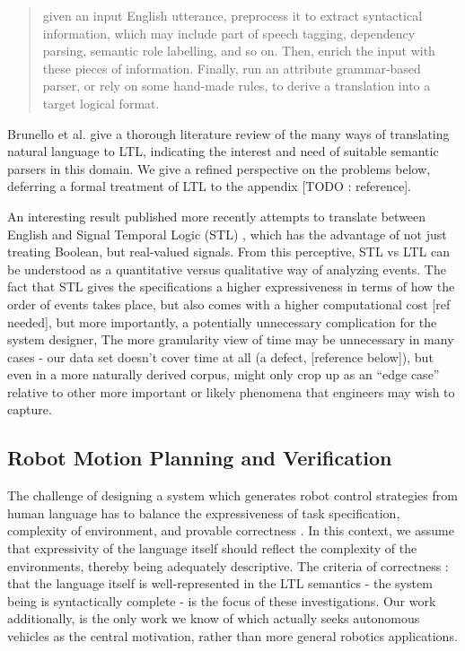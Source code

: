 \documentclass[a4paper, 11pt]{article}
\begin{document}
\begin{quote}
given an input English utterance, preprocess it to extract syntactical information, which may
include part of speech tagging, dependency parsing, semantic role labelling, and so on. Then,
enrich the input with these pieces of information. Finally, run an attribute grammar-based
parser, or rely on some hand-made rules, to derive a translation into a target logical format.
\cite{brunello_et_al}
\end{quote}

Brunello et al. give a thorough literature review of the many ways of
translating natural language to LTL, indicating the interest and need of
suitable semantic parsers in this domain. We give a refined perspective on the
problems below, deferring a formal treatment of LTL to the appendix [TODO :
reference].

An interesting result published more recently attempts to translate between
English and Signal Temporal Logic (STL) \cite{he2021english}, which has the
advantage of not just treating Boolean, but real-valued signals. From this
perceptive, STL vs LTL can be understood as a quantitative versus qualitative
way of analyzing events. The fact that STL gives the specifications a higher
expressiveness in terms of how the order of events takes place, but also comes
with a higher computational cost [ref needed], but more importantly, a
potentially unnecessary complication for the system designer, The more
granularity view of time may be unnecessary in many cases - our data set doesn't
cover time at all (a defect, [reference below]), but even in a more naturally
derived corpus, might only crop up as an ``edge case'' relative to other more
important or likely phenomena that engineers may wish to capture.


\subsection{Robot Motion Planning and Verification}

The challenge of designing a system which generates robot control strategies
from human language has to balance the expressiveness of task specification,
complexity of environment, and provable correctness \cite{4141034}. In this
context, we assume that expressivity of the language itself should reflect the
complexity of the environments, thereby being adequately descriptive. The
criteria of correctness : that the language itself is well-represented in the
LTL semantics - the system being is syntactically complete - is the focus of
these investigations. Our work additionally, is the only work we know of which
actually seeks autonomous vehicles as the central motivation, rather than more
general robotics applications.
\end{document}
